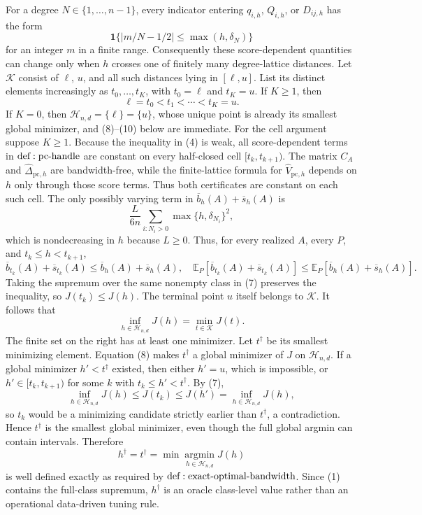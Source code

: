 For a degree \(N\in\{1,\ldots,n-1\}\), every indicator entering \(q_{i,h}\), \(Q_{i,h}\), or \(D_{ij,h}\) has the form
\[
 \mathbf 1\{|m/N-1/2|\leq\max(h,\delta_N)\}
\tag{4}
\]
for an integer \(m\) in a finite range.  Consequently these score-dependent quantities can change only when \(h\) crosses one of finitely many degree-lattice distances.  Let \(\mathcal K\) consist of \(\ell\), \(u\), and all such distances lying in \([\ell,u]\).  List its distinct elements increasingly as \(t_0,\ldots,t_K\), with \(t_0=\ell\) and \(t_K=u\).  If \(K\geq1\), then
\[
 \ell=t_0<t_1<\cdots<t_K=u.
\tag{5}
\]
If \(K=0\), then \(\mathcal H_{n,d}=\{\ell\}=\{u\}\), whose unique point is already its smallest global minimizer, and (8)--(10) below are immediate.  For the cell argument suppose \(K\geq1\).
Because the inequality in (4) is weak, all score-dependent terms in \({\rm def:pc\text{-}handle}\) are constant on every half-closed cell \([t_k,t_{k+1})\).  The matrix \(C_A\) and \(\widehat\Delta_{\mathrm{pc},h}\) are bandwidth-free, while the finite-lattice formula for \(\widehat V_{\mathrm{pc},h}\) depends on \(h\) only through those score terms.  Thus both certificates are constant on each such cell.  The only possibly varying term in \(\overline b_h(A)+\overline s_h(A)\) is
\[
 \frac{L}{6n}\sum_{i:N_i>0}\max\{h,\delta_{N_i}\}^2,
\tag{6}
\]
which is nondecreasing in \(h\) because \(L\geq0\).  Thus, for every realized \(A\), every \(P\), and \(t_k\leq h<t_{k+1}\),
\[
 \overline b_{t_k}(A)+\overline s_{t_k}(A)
 \leq \overline b_h(A)+\overline s_h(A),
 \quad
 \mathbb E_P[\overline b_{t_k}(A)+\overline s_{t_k}(A)]
 \leq \mathbb E_P[\overline b_h(A)+\overline s_h(A)].
\tag{7}
\]
Taking the supremum over the same nonempty class in (7) preserves the inequality, so \(J(t_k)\leq J(h)\).  The terminal point \(u\) itself belongs to \(\mathcal K\).  It follows that
\[
 \inf_{h\in\mathcal H_{n,d}}J(h)=\min_{t\in\mathcal K}J(t).
\tag{8}
\]
The finite set on the right has at least one minimizer.  Let \(t^\dagger\) be its smallest minimizing element.  Equation (8) makes \(t^\dagger\) a global minimizer of \(J\) on \(\mathcal H_{n,d}\).  If a global minimizer \(h'<t^\dagger\) existed, then either \(h'=u\), which is impossible, or \(h'\in[t_k,t_{k+1})\) for some \(k\) with \(t_k\leq h'<t^\dagger\).  By (7),
\[
 \inf_{h\in\mathcal H_{n,d}}J(h)
 \leq J(t_k)\leq J(h')
 =\inf_{h\in\mathcal H_{n,d}}J(h),
\tag{9}
\]
so \(t_k\) would be a minimizing candidate strictly earlier than \(t^\dagger\), a contradiction.  Hence \(t^\dagger\) is the smallest global minimizer, even though the full global argmin can contain intervals.  Therefore
\[
 h^\dagger=t^\dagger
 =\min\operatorname*{argmin}_{h\in\mathcal H_{n,d}}J(h)
\tag{10}
\]
is well defined exactly as required by \({\rm def:exact\text{-}optimal\text{-}bandwidth}\).  Since (1) contains the full-class supremum, \(h^\dagger\) is an oracle class-level value rather than an operational data-driven tuning rule.

